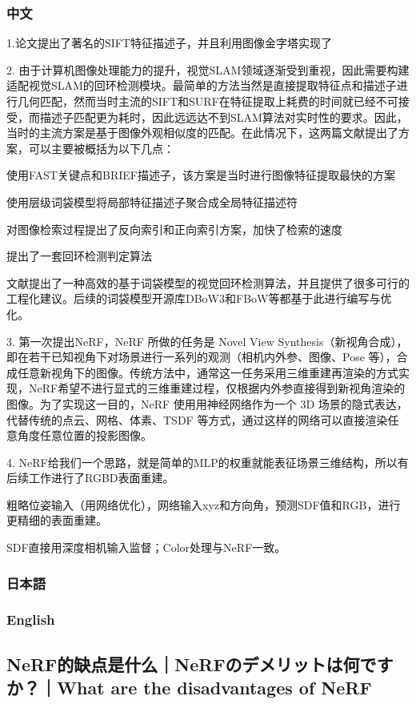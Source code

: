 \documentclass[lang=cn,11pt,a4paper]{elegantpaper}
\begin{document}
\subsubsection{中文}
1.论文提出了著名的SIFT特征描述子，并且利用图像金字塔实现了

2. 由于计算机图像处理能力的提升，视觉SLAM领域逐渐受到重视，因此需要构建适配视觉SLAM的回环检测模块。最简单的方法当然是直接提取特征点和描述子进行几何匹配，然而当时主流的SIFT和SURF在特征提取上耗费的时间就已经不可接受，而描述子匹配更为耗时，因此远远达不到SLAM算法对实时性的要求。因此，当时的主流方案是基于图像外观相似度的匹配。在此情况下，这两篇文献提出了方案，可以主要被概括为以下几点：

使用FAST关键点和BRIEF描述子，该方案是当时进行图像特征提取最快的方案

使用层级词袋模型将局部特征描述子聚合成全局特征描述符

对图像检索过程提出了反向索引和正向索引方案，加快了检索的速度

提出了一套回环检测判定算法 

文献提出了一种高效的基于词袋模型的视觉回环检测算法，并且提供了很多可行的工程化建议。后续的词袋模型开源库DBoW3和FBoW等都基于此进行编写与优化。

3. 第一次提出NeRF，NeRF 所做的任务是 Novel View Synthesis（新视角合成），即在若干已知视角下对场景进行一系列的观测（相机内外参、图像、Pose 等），合成任意新视角下的图像。传统方法中，通常这一任务采用三维重建再渲染的方式实现，NeRF希望不进行显式的三维重建过程，仅根据内外参直接得到新视角渲染的图像。为了实现这一目的，NeRF 使用用神经网络作为一个 3D 场景的隐式表达，代替传统的点云、网格、体素、TSDF 等方式，通过这样的网络可以直接渲染任意角度任意位置的投影图像。

4. NeRF给我们一个思路，就是简单的MLP的权重就能表征场景三维结构，所以有后续工作进行了RGBD表面重建。

粗略位姿输入（用网络优化），网络输入xyz和方向角，预测SDF值和RGB，进行更精细的表面重建。

SDF直接用深度相机输入监督；Color处理与NeRF一致。


\subsubsection{日本語}
\subsubsection{English}

\subsection{NeRF的缺点是什么｜NeRFのデメリットは何ですか？｜What are the disadvantages of NeRF}
\end{document}
